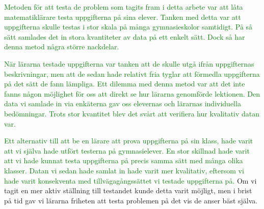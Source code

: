 \textcolor{green}{Metoden för att testa de problem som tagits fram i detta arbete var att låta matematiklärare testa uppgifterna på sina elever. Tanken med detta var att uppgifterna skulle testas i stor skala på många gymnasieskolor samtidigt. På så sätt samlades det in stora kvantiteter av data på ett enkelt sätt. Dock så har denna metod några större nackdelar.}

\textcolor{green}{När lärarna testade uppgifterna var tanken att de skulle utgå ifrån uppgifternas beskrivningar, men att de sedan hade relativt fria tyglar att förmedla uppgifterna på det sätt de fann lämpliga. Ett dilemma med denna metod var att det inte fanns någon möjlighet för oss att direkt se hur lärarna genomförde lektionen. Den data vi samlade in via enkäterna gav oss elevernas och lärarnas individuella bedömningar. Trots stor kvantitet blev det svårt att verifiera hur kvalitativ datan var.}

\textcolor{green}{Ett alternativ till att be en lärare att prova uppgifterna på sin klass, hade varit att vi själva hade utfört testerna på gymnasielever. En stor skillnad hade varit att vi hade kunnat testa uppgifterna på precis samma sätt med många olika klasser. Datan vi sedan hade samlat in hade varit mer kvalitativ, eftersom vi hade varit konsekventa med tillvägagångssättet vi testade uppgifterna på.}
    \textcolor{WildStrawberry}{
    Om vi tagit en mer aktiv ställning till testandet kunde detta varit möjligt, men i brist på tid gav vi lärarna friheten att testa problemen på det vis de anser bäst själva.
}


%
% 
%
% 
%